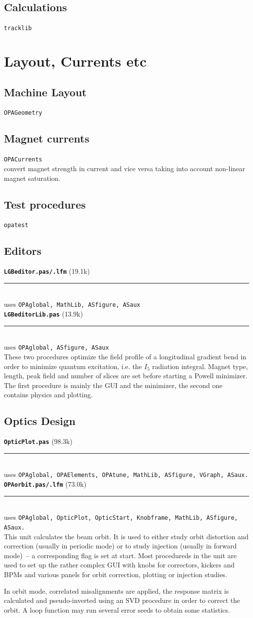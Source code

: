 \documentclass[12pt]{article}
\newcommand\code[1]{{\tt #1}}
\newcommand{\unico}[1]{{\color{burntorange}\code{#1}}}
\newcommand{\opagui}[1]{\colorbox{blue!20}{\code{#1}}}
\newcommand{\oguih}[2]{\subsection{\label{#2}#1}{\Huge\opagui{#2}}\\}
\newcommand{\opauni}[1]{\colorbox{orange!30}{\code{#1}}}
\newcommand{\ounih}[2]{\subsection{\label{#2}#1}{\Huge\opauni{#2}}\\}
\newcommand\opamodule[3]{{\bf \tt #1} #2\\  \rule[3pt]{\textwidth}{0.2pt} \\ {\scriptsize uses \tt  #3}\\[1ex]}
\begin{document}
\ounih{Calculations}{tracklib}

\section{\label{secelse}Layout, Currents etc}

\oguih{Machine Layout}{OPAGeometry}

\oguih{Magnet currents}{OPACurrents}

\unico{getKfromI, getdKdIfac, getIfromK} convert  magnet strength in current and vice versa taking into account non-linear magnet saturation.

\ounih{Test procedures}{opatest} 





\subsection{Editors}



\opamodule{LGBeditor.pas/.lfm}{(19.1k)}{OPAglobal,  MathLib, ASfigure, ASaux}
\opamodule{LGBeditorLib.pas}{(13.9k)}{OPAglobal, ASfigure, ASaux}
These two procedures optimize the field profile of a longitudinal gradient bend in order to minimize quantum excitation, i.e. the $I_5$ radiation integral. Magnet type, length, peak field and number of slices are set before starting a Powell minimizer. The first procedure is mainly the GUI and the minimizer, the second one contains physics and plotting.

\subsection{Optics Design}


\opamodule{OpticPlot.pas}{(98.3k)}{OPAglobal, OPAElements, OPAtune, MathLib, ASfigure, VGraph, ASaux.}

\opamodule{OPAorbit.pas/.lfm}{(73.0k)}{OPAglobal, OpticPlot,  OpticStart, Knobframe, MathLib, ASfigure, ASaux.}
This unit calculates the beam orbit. It is used to either study orbit distortion and correction (usually in periodic mode) or to study injection (usually in forward mode)~-- a corresponding flag is set at start. Most procedureds in the unit are used to set up the rather complex GUI with knobs for correctors, kickers and BPMs and various panels for orbit correction, plotting or injection studies.

In orbit mode, correlated misalignments are applied, the response matrix is calculated and pseudo-inverted using an SVD procedure in order to correct the orbit. A loop function may run several error seeds to obtain some statistics.
\end{document}
